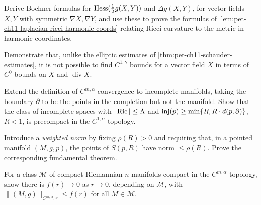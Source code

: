 \begin{remark}
  \label{rem:pet-ch11-exercise-11-6-5}
  Derive Bochner formulas for $\operatorname{Hess}(\tfrac12g(X,Y))$ and
  $\Delta g(X,Y)$, for vector fields $X,Y$ with symmetric $\nabla X,\nabla Y$,
  and use these to prove the formulas of
  \cref{lem:pet-ch11-laplacian-ricci-harmonic-coords} relating Ricci
  curvature to the metric in harmonic coordinates.
\end{remark}

\begin{remark}
  \label{rem:pet-ch11-exercise-11-6-6}
  Demonstrate that, unlike the elliptic estimates of
  \cref{thm:pet-ch11-schauder-estimates}, it is not possible to find
  $C^{1,\gamma}$ bounds for a vector field $X$ in terms of $C^0$ bounds on
  $X$ and $\operatorname{div}X$.
\end{remark}

\begin{remark}
  \label{rem:pet-ch11-exercise-11-6-7}
  Extend the definition of $C^{m,\alpha}$ convergence to incomplete manifolds,
  taking the boundary $\partial$ to be the points in the completion but not
  the manifold.
  Show that the class of incomplete spaces with $|\operatorname{Ric}|\le\Lambda$ and
  $\operatorname{inj}(p)\ge\min\{R,R\cdot d(p,\partial)\}$, $R<1$, is precompact in the
  $C^{1,\alpha}$ topology.
\end{remark}

\begin{remark}
  \label{rem:pet-ch11-exercise-11-6-8}
  Introduce a \emph{weighted norm} by fixing $\rho(R)>0$ and requiring that, in a
  pointed manifold $(M,g,p)$, the points of $S(p,R)$ have norm $\le\rho(R)$.
  Prove the corresponding fundamental theorem.
\end{remark}

\begin{remark}
  \label{rem:pet-ch11-exercise-11-6-9}
  For a class $\mathcal{M}$ of compact Riemannian $n$-manifolds compact in
  the $C^{m,\alpha}$ topology, show there is $f(r)\to0$ as $r\to0$, depending
  on $\mathcal{M}$, with $\|(M,g)\|_{C^{m,\alpha},r}\le f(r)$ for all
  $M\in\mathcal{M}$.
\end{remark}

